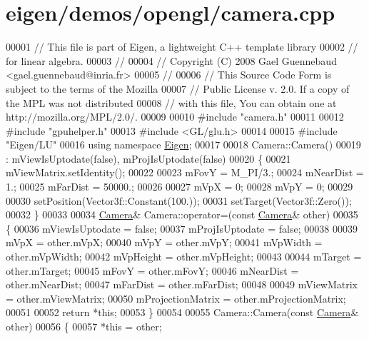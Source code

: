 \hypertarget{eigen_2demos_2opengl_2camera_8cpp_source}{}\section{eigen/demos/opengl/camera.cpp}
\label{eigen_2demos_2opengl_2camera_8cpp_source}

\begin{DoxyCode}
00001 \textcolor{comment}{// This file is part of Eigen, a lightweight C++ template library}
00002 \textcolor{comment}{// for linear algebra.}
00003 \textcolor{comment}{//}
00004 \textcolor{comment}{// Copyright (C) 2008 Gael Guennebaud <gael.guennebaud@inria.fr>}
00005 \textcolor{comment}{//}
00006 \textcolor{comment}{// This Source Code Form is subject to the terms of the Mozilla}
00007 \textcolor{comment}{// Public License v. 2.0. If a copy of the MPL was not distributed}
00008 \textcolor{comment}{// with this file, You can obtain one at http://mozilla.org/MPL/2.0/.}
00009 
00010 \textcolor{preprocessor}{#include "camera.h"}
00011 
00012 \textcolor{preprocessor}{#include "gpuhelper.h"}
00013 \textcolor{preprocessor}{#include <GL/glu.h>}
00014 
00015 \textcolor{preprocessor}{#include "Eigen/LU"}
00016 \textcolor{keyword}{using namespace }\hyperlink{namespace_eigen}{Eigen};
00017 
00018 Camera::Camera()
00019     : mViewIsUptodate(false), mProjIsUptodate(false)
00020 \{
00021     mViewMatrix.setIdentity();
00022     
00023     mFovY = M\_PI/3.;
00024     mNearDist = 1.;
00025     mFarDist = 50000.;
00026     
00027     mVpX = 0;
00028     mVpY = 0;
00029 
00030     setPosition(Vector3f::Constant(100.));
00031     setTarget(Vector3f::Zero());
00032 \}
00033 
00034 \hyperlink{class_camera}{Camera}& Camera::operator=(\textcolor{keyword}{const} \hyperlink{class_camera}{Camera}& other)
00035 \{
00036     mViewIsUptodate = \textcolor{keyword}{false};
00037     mProjIsUptodate = \textcolor{keyword}{false};
00038     
00039     mVpX = other.mVpX;
00040     mVpY = other.mVpY;
00041     mVpWidth = other.mVpWidth;
00042     mVpHeight = other.mVpHeight;
00043 
00044     mTarget = other.mTarget;
00045     mFovY = other.mFovY;
00046     mNearDist = other.mNearDist;
00047     mFarDist = other.mFarDist;
00048     
00049     mViewMatrix = other.mViewMatrix;
00050     mProjectionMatrix = other.mProjectionMatrix;
00051 
00052     \textcolor{keywordflow}{return} *\textcolor{keyword}{this};
00053 \}
00054 
00055 Camera::Camera(\textcolor{keyword}{const} \hyperlink{class_camera}{Camera}& other)
00056 \{
00057     *\textcolor{keyword}{this} = other;

\end{DoxyCode}
